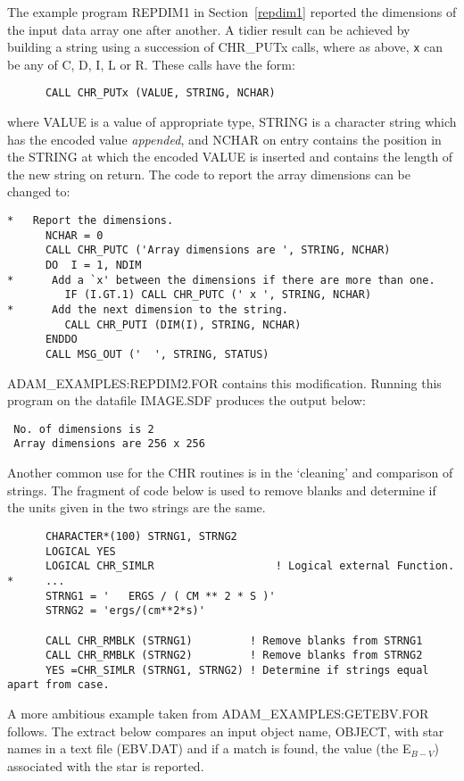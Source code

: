 The example program REPDIM1 in Section~\ref{repdim1} reported the dimensions of 
the input data array one after another.
A tidier result can be achieved by building a  string using a succession of
CHR\_PUTx calls, where as above, {\tt x} can be any of C, D, I, L or  R.
These calls have the form:
\begin{verbatim}
      CALL CHR_PUTx (VALUE, STRING, NCHAR)
\end{verbatim}
where VALUE is a value of appropriate type, STRING is a character string which
has the encoded value {\sl appended},  and NCHAR on entry contains the
position in the STRING at which the encoded VALUE is inserted and contains
the length of the new string on return.
The code to report the array dimensions can be changed to:
\begin{verbatim}
*   Report the dimensions.
      NCHAR = 0
      CALL CHR_PUTC ('Array dimensions are ', STRING, NCHAR)
      DO  I = 1, NDIM
*      Add a `x' between the dimensions if there are more than one.
         IF (I.GT.1) CALL CHR_PUTC (' x ', STRING, NCHAR)
*      Add the next dimension to the string.
         CALL CHR_PUTI (DIM(I), STRING, NCHAR)
      ENDDO
      CALL MSG_OUT ('  ', STRING, STATUS) 
\end{verbatim}
ADAM\_EXAMPLES:REPDIM2.FOR contains this modification.
Running this program on the datafile IMAGE.SDF produces the output below:
\begin{verbatim}
 No. of dimensions is 2
 Array dimensions are 256 x 256
\end{verbatim}
Another common use for the CHR routines is in the `cleaning' and
comparison  of strings.
The fragment of code below is used to remove blanks and
determine if the units given in the two strings are the same.
\begin{verbatim}
      CHARACTER*(100) STRNG1, STRNG2
      LOGICAL YES
      LOGICAL CHR_SIMLR                   ! Logical external Function.
*     ...      
      STRNG1 = '   ERGS / ( CM ** 2 * S )'
      STRNG2 = 'ergs/(cm**2*s)'

      CALL CHR_RMBLK (STRNG1)         ! Remove blanks from STRNG1
      CALL CHR_RMBLK (STRNG2)         ! Remove blanks from STRNG2
      YES =CHR_SIMLR (STRNG1, STRNG2) ! Determine if strings equal apart from case.
\end{verbatim}
\newpage
A more ambitious example taken from ADAM\_EXAMPLES:GETEBV.FOR follows.
The  extract below compares an input object name, OBJECT, 
with star names 
in a text file (EBV.DAT) and if a match is found, the 
value (the E$_{B-V}$) associated with the star is reported.
